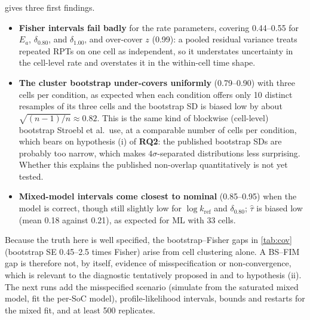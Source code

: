 \documentclass[11pt,letterpaper]{article}
\newcommand{\RQ}[1]{\textbf{RQ#1}}
\begin{document}
 gives three first findings.
\begin{itemize}
  \item \textbf{Fisher intervals fail badly} for the rate parameters, covering 0.44--0.55 for $E_a$, $\delta_{0.80}$, and $\delta_{1.00}$, and over-cover $z$ (0.99): a pooled residual variance treats repeated RPTs on one cell as independent, so it understates uncertainty in the cell-level rate and overstates it in the within-cell time shape.
  \item \textbf{The cluster bootstrap under-covers uniformly} (0.79--0.90) with three cells per condition, as expected when each condition offers only 10 distinct resamples of its three cells and the bootstrap SD is biased low by about $\sqrt{(n-1)/n}\approx0.82$. This is the same kind of blockwise (cell-level) bootstrap Stroebl et al.\ use, at a comparable number of cells per condition, which bears on hypothesis (i) of \RQ2: the published bootstrap SDs are probably too narrow, which makes $4\sigma$-separated distributions less surprising. Whether this explains the published non-overlap quantitatively is not yet tested.
  \item \textbf{Mixed-model intervals come closest to nominal} (0.85--0.95) when the model is correct, though still slightly low for $\log k_{\mathrm{ref}}$ and $\delta_{0.80}$; $\hat\tau$ is biased low (mean 0.18 against 0.21), as expected for ML with 33 cells.
\end{itemize}
Because the truth here is well specified, the bootstrap--Fisher gaps in \cref{tab:cov} (bootstrap SE 0.45--2.5 times Fisher) arise from cell clustering alone. A BS--FIM gap is therefore not, by itself, evidence of misspecification or non-convergence, which is relevant to the diagnostic tentatively proposed in \cite{stroebl2026} and to hypothesis (ii). The next runs add the misspecified scenario (simulate from the saturated mixed model, fit the per-SoC model), profile-likelihood intervals, bounds and restarts for the mixed fit, and at least 500 replicates.
\end{document}
